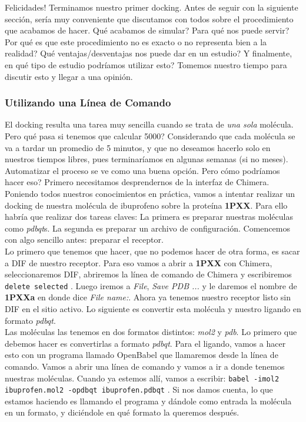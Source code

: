 \documentclass[10pt,letterpaper]{article}
\newcommand{\inlinecode}[1]{
\colorbox{light-gray}{\texttt{#1}}
}
\begin{document}
Felicidades! Terminamos nuestro primer docking. Antes de seguir con la siguiente secci\'on, ser\'ia muy conveniente que discutamos con todos sobre el procedimiento que acabamos de hacer. Qu\'e acabamos de simular? Para qu\'e nos puede servir? Por qu\'e es que este procedimiento no es exacto o no representa bien a la realidad? Qu\'e ventajas/desventajas nos puede dar en un estudio? Y finalmente, en qu\'e tipo de estudio podr\'iamos utilizar esto? Tomemos nuestro tiempo para discutir esto y llegar a una opini\'on.

\subsubsection{Utilizando una L\'inea de Comando}
El docking resulta una tarea muy sencilla cuando se trata de \emph{una sola} mol\'ecula. Pero qu\'e pasa si tenemos que calcular 5000? Considerando que cada mol\'ecula se va a tardar un promedio de 5 minutos, y que no deseamos hacerlo solo en nuestros tiempos libres, pues terminar\'iamos en algunas semanas (si no meses). Automatizar el proceso se ve como una buena opci\'on. Pero c\'omo podr\'iamos hacer eso? Primero necesitamos desprendernos de la interfaz de Chimera.\\

Poniendo todos nuestros conocimientos en pr\'actica, vamos a intentar realizar un docking de nuestra mol\'ecula de ibuprofeno sobre la prote\'ina \textbf{1PXX}. Para ello habr\'ia que realizar dos tareas claves: La primera es preparar nuestras mol\'eculas como \textit{pdbqt}s. La segunda es preparar un archivo de configuraci\'on. Comencemos con algo sencillo antes: preparar el receptor.\\

Lo primero que tenemos que hacer, que no podemos hacer de otra forma, es sacar a DIF de nuestro receptor. Para eso vamos a abrir a \textbf{1PXX} con Chimera, seleccionaremos DIF, abriremos la l\'inea de comando de Chimera y escribiremos \inlinecode{delete selected}. Luego iremos a \emph{File}, \emph{Save PDB ...} y le daremos el nombre de \textbf{1PXXa} en donde dice \emph{File name:}. Ahora ya tenemos nuestro receptor listo sin DIF en el sitio activo. Lo siguiente es convertir esta mol\'ecula y nuestro ligando en formato \emph{pdbqt}.\\

Las mol\'eculas las tenemos en dos formatos distintos: \emph{mol2} y \emph{pdb}. Lo primero que debemos hacer es convertirlas a formato \emph{pdbqt}. Para el ligando, vamos a hacer esto con un programa llamado OpenBabel que llamaremos desde la l\'inea de comando. Vamos a abrir una l\'inea de comando y vamos a ir a donde tenemos nuestras mol\'eculas. Cuando ya estemos all\'i, vamos a escribir: \inlinecode{babel -imol2 ibuprofen.mol2 -opdbqt ibuprofen.pdbqt}. Si nos damos cuenta, lo que estamos haciendo es llamando el programa y d\'andole como entrada la mol\'ecula en un formato, y dici\'endole en qu\'e formato la queremos despu\'es.\\
\end{document}
